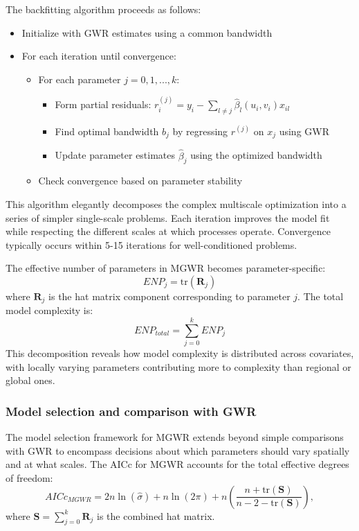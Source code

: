 \documentclass[smallextended, natbib]{svjour3}       %
\begin{document}
The backfitting algorithm proceeds as follows:
\begin{itemize}
    \item Initialize with GWR estimates using a common bandwidth
    \item For each iteration until convergence:
    \begin{itemize}
        \item For each parameter $j = 0, 1, ..., k$:
        \begin{itemize}
            \item Form partial residuals: $r_i^{(j)} = y_i - \sum_{l \neq j} \hat{\beta}_l(u_i, v_i)x_{il}$
            \item Find optimal bandwidth $b_j$ by regressing $r^{(j)}$ on $x_j$ using GWR
            \item Update parameter estimates $\hat{\beta}_j$ using the optimized bandwidth
        \end{itemize}
        \item Check convergence based on parameter stability
    \end{itemize}
\end{itemize}

This algorithm elegantly decomposes the complex multiscale optimization into a series of simpler single-scale problems. Each iteration improves the model fit while respecting the different scales at which processes operate. Convergence typically occurs within 5-15 iterations for well-conditioned problems.

The effective number of parameters in MGWR becomes parameter-specific:
$$ENP_j = \mathrm{tr}(\mathbf{R}_j)$$
where $\mathbf{R}_j$ is the hat matrix component corresponding to parameter $j$. The total model complexity is:
$$ENP_{total} = \sum_{j=0}^{k} ENP_j$$
This decomposition reveals how model complexity is distributed across covariates, with locally varying parameters contributing more to complexity than regional or global ones.

\subsubsection*{Model selection and comparison with GWR}

The model selection framework for MGWR extends beyond simple comparisons with GWR to encompass decisions about which parameters should vary spatially and at what scales. 
The AICc for MGWR accounts for the total effective degrees of freedom:
$$AICc_{MGWR} = 2n\ln(\hat{\sigma}) + n\ln(2\pi) + n\left(\frac{n + \mathrm{tr}(\mathbf{S})}{n - 2 - \mathrm{tr}(\mathbf{S})}\right),$$
where $\mathbf{S} = \sum_{j=0}^{k} \mathbf{R}_j$ is the combined hat matrix.
\end{document}
